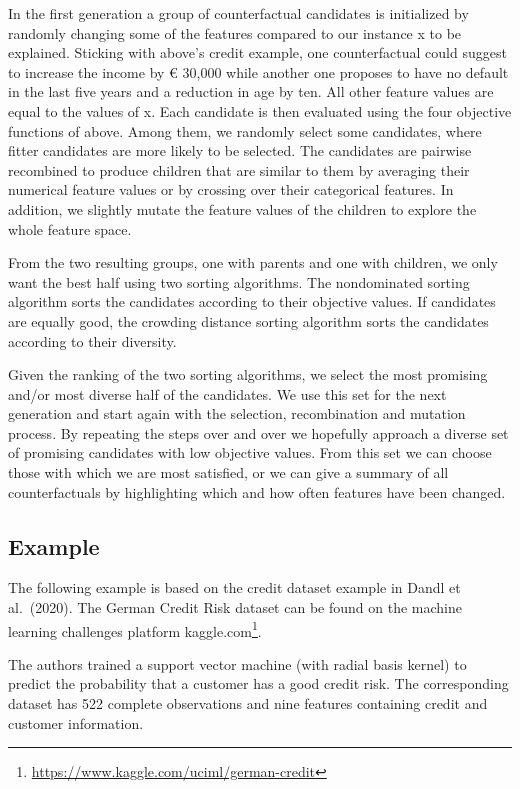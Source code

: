 \documentclass[
  11pt,
]{scrbook}
\renewcommand{\href}[2]{#2\footnote{\url{#1}}}
\begin{document}
In the first generation a group of counterfactual candidates is initialized by randomly changing some of the features compared to our instance x to be explained.
Sticking with above's credit example, one counterfactual could suggest to increase the income by € 30,000 while another one proposes to have no default in the last five years and a reduction in age by ten.
All other feature values are equal to the values of x.
Each candidate is then evaluated using the four objective functions of above.
Among them, we randomly select some candidates, where fitter candidates are more likely to be selected.
The candidates are pairwise recombined to produce children that are similar to them by averaging their numerical feature values or by crossing over their categorical features.
In addition, we slightly mutate the feature values of the children to explore the whole feature space.

From the two resulting groups, one with parents and one with children, we only want the best half using two sorting algorithms.
The nondominated sorting algorithm sorts the candidates according to their objective values.
If candidates are equally good, the crowding distance sorting algorithm sorts the candidates according to their diversity.

Given the ranking of the two sorting algorithms, we select the most promising and/or most diverse half of the candidates.
We use this set for the next generation and start again with the selection, recombination and mutation process.
By repeating the steps over and over we hopefully approach a diverse set of promising candidates with low objective values.
From this set we can choose those with which we are most satisfied, or we can give a summary of all counterfactuals by highlighting which and how often features have been changed.

\hypertarget{example-8}{%
\subsection{Example}\label{example-8}}

The following example is based on the credit dataset example in Dandl et al.~(2020).
The German Credit Risk dataset can be found on the machine learning challenges platform \href{https://www.kaggle.com/uciml/german-credit}{kaggle.com}.

The authors trained a support vector machine (with radial basis kernel) to predict the probability that a customer has a good credit risk.
The corresponding dataset has 522 complete observations and nine features containing credit and customer information.
\end{document}
